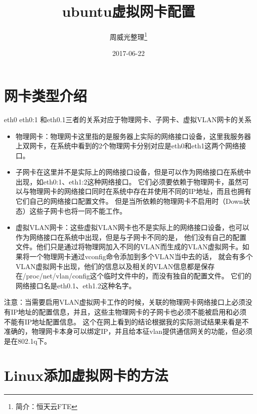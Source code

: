 \documentclass[a4paper,left=1.5cm,right=1.5cm,11pt]{article}
\title{ubuntu虚拟网卡配置}
\author{周威光整理\footnote{简介：恒天云FTE}}
\date{2017-06-22}
\begin{document}
\maketitle
\clearpage
\tableofcontents
\clearpage
\section{网卡类型介绍}
eth0 eth0:1 和eth0.1三者的关系对应于物理网卡、子网卡、虚拟VLAN网卡的关系\\
\begin{itemize}
	\item[1.]物理网卡：物理网卡这里指的是服务器上实际的网络接口设备，这里我服务器上双网卡，在系统中看到的2个物理网卡分别对应是eth0和eth1这两个网络接口。
	\item[2.]子网卡在这里并不是实际上的网络接口设备，但是可以作为网络接口在系统中出现，如eth0:1、eth1:2这种网络接口。
	它们必须要依赖于物理网卡，虽然可以与物理网卡的网络接口同时在系统中存在并使用不同的IP地址，而且也拥有它们自己的网络接口配置文件。
	但是当所依赖的物理网卡不启用时（Down状态）这些子网卡也将一同不能工作。
	\item[3.]虚拟VLAN网卡：这些虚拟VLAN网卡也不是实际上的网络接口设备，也可以作为网络接口在系统中出现，但是与子网卡不同的是，
	他们没有自己的配置文件。他们只是通过将物理网加入不同的VLAN而生成的VLAN虚拟网卡。如果将一个物理网卡通过vconfig命令添加到多个VLAN当中去的话，
	就会有多个VLAN虚拟网卡出现，他们的信息以及相关的VLAN信息都是保存在/proc/net/vlan/config这个临时文件中的，而没有独自的配置文件。
	它们的网络接口名是eth0.1、eth1.2这种名字。
\end{itemize}
注意：当需要启用VLAN虚拟网卡工作的时候，关联的物理网卡网络接口上必须没有IP地址的配置信息，并且，这些主物理网卡的子网卡也必须不能被启用和必须不能有IP地址配置信息。
这个在网上看到的结论根据我的实际测试结果来看是不准确的，物理网卡本身可以绑定IP，并且给本征vlan提供通信网关的功能，但必须是在802.1q下。
\section{Linux添加虚拟网卡的方法}
\end{document}
